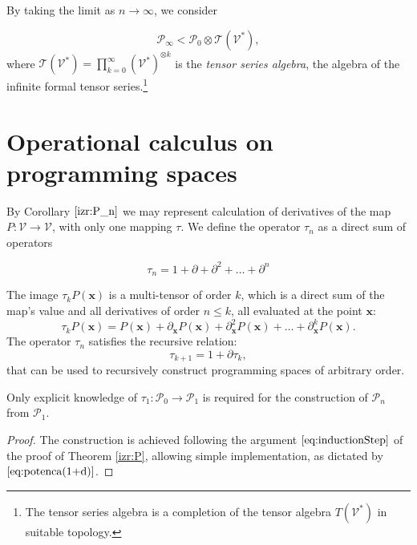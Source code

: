 \documentclass[smallcondensed]{svjour3}
\newcommand{\T}{\mathcal{T}}
\newcommand{\VV}{\mathcal{V}}
\newcommand{\x}{\mathbf{x}}
\newcommand{\dP}{\mathcal{P}}
\newcommand{\D}{\partial}
\newcommand{\sumd}{\tau}
\begin{document}
By taking the limit as $n\to \infty$, we consider 
 	
 	\begin{equation}
 	\label{eq:P_algebra}
 	 	    \dP_\infty < \dP_0\otimes \T(\VV^*),
 	\end{equation}
where $\T(\VV^*)=\prod_{k=0}^\infty (\VV^*)^{\otimes k}$ is the \emph{tensor series
  algebra}, the algebra of the infinite formal tensor series.\footnote{The
  tensor series algebra is a completion of the tensor algebra $T(\VV^*)$ in suitable topology.}

\section{Operational calculus on programming spaces}\label{sec:operational}



By Corollary $\ref{izr:P_n}$ we may represent calculation of derivatives of the
map $P:\VV\to \VV$, with only one mapping $\sumd$. We define the operator
$\sumd_n$ as a direct sum of operators
 
 \begin{equation}\label{eq:DD}
  	\sumd_n = 1+\D +\D^2 +\ldots + \D^n 
  \end{equation}
  
The image $\sumd_kP(\x)$ is a multi-tensor of order $k$, which is a direct sum of the map's value and all derivatives of order $n\le k$, all evaluated at the point $\x$:
\begin{equation}
  \label{eq:multi_odvod}
  \sumd_kP(\x) = P(\mathbf{x})+\partial_\mathbf{x} P(\mathbf{x}) + \partial^2_\mathbf{x} P(\mathbf{x}) + \ldots + \partial^k_\mathbf{x} P(\mathbf{x}).
\end{equation}
The operator $\sumd_n$ satisfies the recursive relation:
  \begin{equation}
    \label{eq:potenca(1+d)}
    \sumd_{k+1}=1+\D\sumd_{k},
  \end{equation}
that can be used to recursively construct programming spaces of arbitrary order. 
\begin{proposition}
Only explicit knowledge of $\sumd_1:\dP_0\to\dP_1$ is required for the
construction of $\dP_n$ from $\dP_1$. 
\end{proposition}
\begin{proof}
  The construction is achieved following the argument $\eqref{eq:inductionStep}$ of the proof of Theorem \ref{izr:P}, allowing simple implementation, as dictated by $\eqref{eq:potenca(1+d)}$. 
\end{proof}
        
\end{document}
